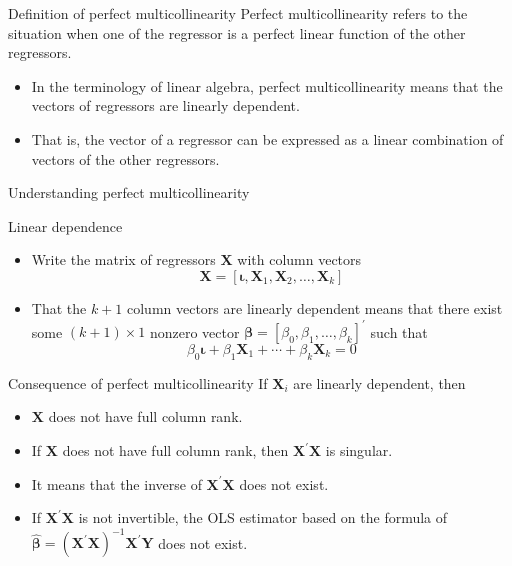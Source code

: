 \documentclass[presentation,10pt]{beamer}
\begin{document}
\begin{frame}[label={sec:orgc4efd89}]{Definition of perfect multicollinearity}
\alert{Perfect multicollinearity} refers to the situation when one of the
regressor is a perfect linear function of the other regressors.
\begin{itemize}
\item In the terminology of linear algebra, perfect multicollinearity
means that the vectors of regressors are linearly dependent.
\item That is, the vector of a regressor can be expressed as a linear
combination of vectors of the other regressors.
\end{itemize}
\end{frame}

\begin{frame}[label={sec:org29d4001}]{Understanding perfect multicollinearity}
\begin{block}{Linear dependence}
\begin{itemize}
\item Write the matrix of regressors \(\mathbf{X}\) with column vectors
\[
  \mathbf{X} = [\boldsymbol{\iota}, \boldsymbol{X}_1, \boldsymbol{X}_2, \ldots, \boldsymbol{X}_k ]
  \]
\item That the \(k+1\) column vectors are linearly dependent means that there
exist some \((k+1) \times 1\) nonzero vector \(\boldsymbol{\beta} =
  [\beta_0, \beta_1, \ldots, \beta_k]^{\prime}\) such that
\[
  \beta_0 \boldsymbol{\iota} + \beta_1 \boldsymbol{X}_1 + \cdots + \beta_k
  \boldsymbol{X}_k = 0 
  \]
\end{itemize}
\end{block}
\end{frame}

\begin{frame}[label={sec:org790340a}]{Consequence of perfect multicollinearity}
If \(\boldsymbol{X}_i\) are linearly dependent, then
\begin{itemize}
\item \(\mathbf{X}\) does not have full column rank.
\item If \(\mathbf{X}\) does not have full column rank, then
\(\mathbf{X}^{\prime} \mathbf{X}\) is singular.
\item It means that the inverse
of \(\mathbf{X}^{\prime} \mathbf{X}\) does not exist.
\item If \(\mathbf{X}^{\prime} \mathbf{X}\) is not invertible, the OLS
estimator based on the formula of \(\boldsymbol{\hat{\beta}} =
  (\mathbf{X}^{\prime} \mathbf{X})^{-1} \mathbf{X}^{\prime}
  \mathbf{Y}\) does not exist.
\end{itemize}
\end{frame}
\end{document}
